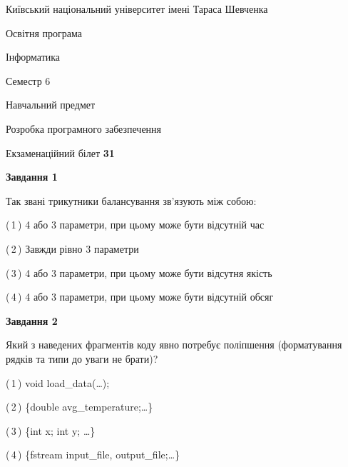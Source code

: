 \documentclass[10pt, ukrainian]{article}
\begin{document}
{{\begin {small}\par
{ \center  Київський національний університет імені Тараса Шевченка \par}
{\parbox {5 cm}{Освітня програма \hfill}{\parbox {7 cm}{Інформатика \hfill}}\parbox {6 cm}{\hfill Семестр 6}}\par
{\parbox {5 cm} {Навчальний предмет \hfill}\parbox {7 cm}{Розробка програмного забезпечення \hfill}\parbox {6cm}{\hfill}\par}\vspace{-7pt} \end{small}}{\center Екзаменаційний білет \No \textbf
{ 31 }\par}}
{
\begin {large}
{\begin {center}\textbf{Завдання 1}\end {center}}\par
Так звані трикутники балансування зв'язують між собою:\par
\vspace{2mm}



(\,1\,) 4 або 3 параметри, при цьому може бути відсутній час%



(\,2\,) Завжди рівно 3 параметри%



(\,3\,) 4 або 3 параметри, при цьому може бути відсутня якість%



(\,4\,) 4 або 3 параметри, при цьому може бути відсутній обсяг %


{\begin {center}\textbf{Завдання 2}\end {center}}\par
Який з наведених фрагментів коду явно потребує поліпшення (форматування рядків та типи до уваги не брати)?\par
\vspace{2mm}



(\,1\,) void load\_data(…);%



(\,2\,) \{double avg\_temperature;…\} %



(\,3\,) \{int x; int y; …\}%



(\,4\,) \{fstream input\_file, output\_file;…\} %



\end{large}}
\end{document}
